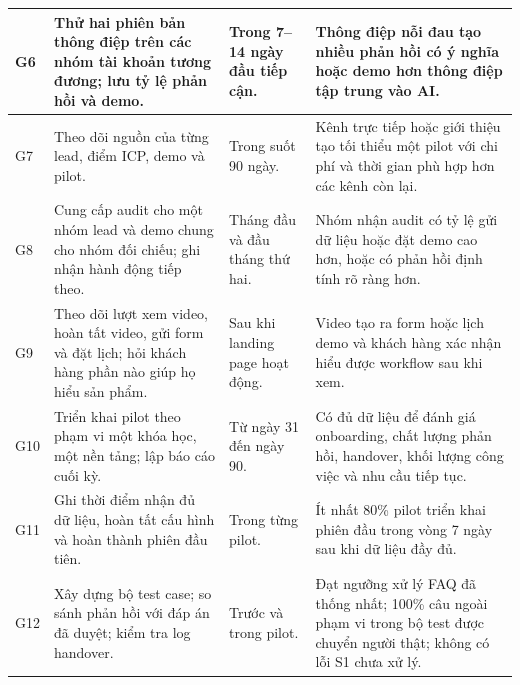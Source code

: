 \begin{longtable}{
    p{}
    p{}
    p{}
    p{}
}
    \hline

    G6
    &
    Thử hai phiên bản thông điệp trên các nhóm tài khoản tương đương; lưu tỷ lệ phản hồi và demo.
    &
    Trong 7--14 ngày đầu tiếp cận.
    &
    Thông điệp nỗi đau tạo nhiều phản hồi có ý nghĩa hoặc demo hơn thông điệp tập trung vào AI. \\

    \hline

    G7
    &
    Theo dõi nguồn của từng lead, điểm ICP, demo và pilot.
    &
    Trong suốt 90 ngày.
    &
    Kênh trực tiếp hoặc giới thiệu tạo tối thiểu một pilot với chi phí và thời gian phù hợp hơn các kênh còn lại. \\

    \hline

    G8
    &
    Cung cấp audit cho một nhóm lead và demo chung cho nhóm đối chiếu; ghi nhận hành động tiếp theo.
    &
    Tháng đầu và đầu tháng thứ hai.
    &
    Nhóm nhận audit có tỷ lệ gửi dữ liệu hoặc đặt demo cao hơn, hoặc có phản hồi định tính rõ ràng hơn. \\

    \hline

    G9
    &
    Theo dõi lượt xem video, hoàn tất video, gửi form và đặt lịch; hỏi khách hàng phần nào giúp họ hiểu sản phẩm.
    &
    Sau khi landing page hoạt động.
    &
    Video tạo ra form hoặc lịch demo và khách hàng xác nhận hiểu được workflow sau khi xem. \\

    \hline

    G10
    &
    Triển khai pilot theo phạm vi một khóa học, một nền tảng; lập báo cáo cuối kỳ.
    &
    Từ ngày 31 đến ngày 90.
    &
    Có đủ dữ liệu để đánh giá onboarding, chất lượng phản hồi, handover, khối lượng công việc và nhu cầu tiếp tục. \\

    \hline

    G11
    &
    Ghi thời điểm nhận đủ dữ liệu, hoàn tất cấu hình và hoàn thành phiên đầu tiên.
    &
    Trong từng pilot.
    &
    Ít nhất 80\% pilot triển khai phiên đầu trong vòng 7 ngày sau khi dữ liệu đầy đủ. \\

    \hline

    G12
    &
    Xây dựng bộ test case; so sánh phản hồi với đáp án đã duyệt; kiểm tra log handover.
    &
    Trước và trong pilot.
    &
    Đạt ngưỡng xử lý FAQ đã thống nhất; 100\% câu ngoài phạm vi trong bộ test được chuyển người thật; không có lỗi S1 chưa xử lý. \\


\end{longtable}
